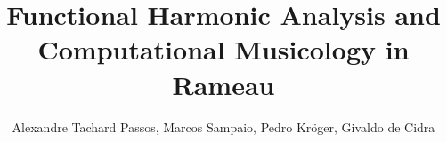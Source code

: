 \documentclass[12pt]{article}
\title{Functional Harmonic Analysis and Computational Musicology in
  Rameau}
\author{Alexandre Tachard Passos\inst{1}, Marcos Sampaio\inst{2},
  Pedro Kröger\inst{2}, Givaldo de Cidra\inst{2}}
\begin{document}
\maketitle

\begin{abstract}

\end{abstract}





\end{document}
